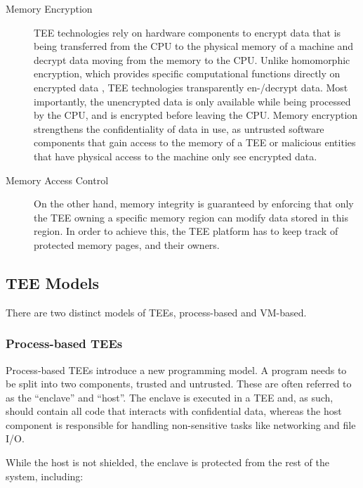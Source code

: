 \begin{description}
  \item[Memory Encryption]
    TEE technologies rely on hardware components to encrypt data that is being
    transferred from the CPU to the physical memory of a machine and decrypt
    data moving from the memory to the CPU. Unlike homomorphic encryption, which
    provides specific computational functions directly on encrypted data
    \cite{monique2013homomorphicencryption}, TEE technologies transparently
    en-/decrypt data. Most importantly, the unencrypted data is only available
    while being processed by the CPU, and is encrypted before leaving the CPU.
    Memory encryption strengthens the confidentiality of data in use, as
    untrusted software components that gain access to the memory of a TEE or
    malicious entities that have physical access to the machine only see
    encrypted data.

  \item[Memory Access Control]
    On the other hand, memory integrity is guaranteed by enforcing that only the
    TEE owning a specific memory region can modify data stored in this region.
    In order to achieve this, the TEE platform has to keep track of protected
    memory pages, and their owners.
\end{description}

\subsection{TEE Models}
\label{sec:tee-models}

There are two distinct models of TEEs, process-based and VM-based.

\subsubsection{Process-based TEEs}
\label{sec:process-based-tees}

Process-based TEEs introduce a new programming model. A program needs to be
split into two components, trusted and untrusted. These are often referred to as
the ``enclave'' and ``host''. The enclave is executed in a TEE and, as such,
should contain all code that interacts with confidential data, whereas the host
component is responsible for handling non-sensitive tasks like networking and
file I/O.

While the host is not shielded, the enclave is protected from the rest of the
system, including:

